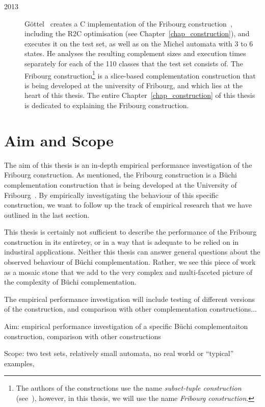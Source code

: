 {\begin{description}
\item[2013] Göttel~\cite{2013_bsc_goettel} creates a C implementation of the Fribourg construction~\cite{2014_joel_ulrich}, including the R2C optimisation (see Chapter~\ref{chap_construction}), and executes it on the \goal{} test set, as well as on the Michel automata with 3 to 6 states. He analyses the resulting complement sizes and execution times separately for each of the 110 classes that the \goal{} test set consists of. The Fribourg construction\footnote{The authors of the constructions use the name \textit{subset-tuple construction} (see~\cite{2014_joel_ulrich}), however, in this thesis, we will use the name \textit{Fribourg construction}.} is a slice-based complementation construction that is being developed at the university of Fribourg, and which lies at the heart of this thesis. The entire Chapter~\ref{chap_construction} of this thesis is dedicated to explaining the Fribourg construction.
\end{description}}


\section{Aim and Scope}
The aim of this thesis is an in-depth empirical performance investigation of the Fribourg construction. As mentioned, the Fribourg construction is a Büchi complementation construction that is being developed at the University of Fribourg~\cite{2014_joel_ulrich}. By empirically investigating the behaviour of this specific construction, we want to follow up the track of empirical research that we have outlined in the last section.

This thesis is certainly not sufficient to describe the performance of the Fribourg construction in its entiretey, or in a way that is adequate to be relied on in industiral applications. Neither this thesis can answer general questions about the observed behaviour of Büchi complementation. Rather, we see this piece of work as a mosaic stone that we add to the very complex and multi-faceted picture of the complexity of Büchi complementation.

The empirical performance investigation will include testing of different versions of the construction, and comparison with other complementation constructions...


Aim: empirical performance investigation of a specific Büchi complementaiton construction, comparison with other constructions

Scope: two test sets, relatively small automata, no real world or ``typical'' examples,

